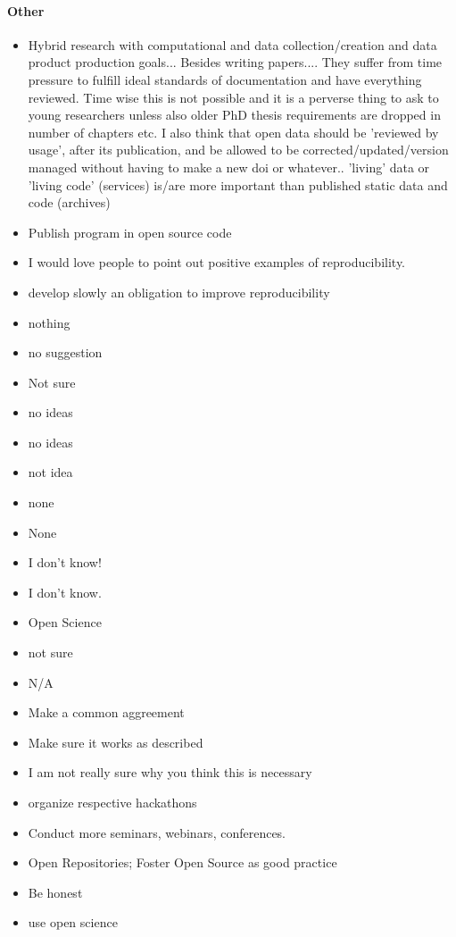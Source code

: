 \documentclass{article}
\begin{document}
\paragraph{Other}
\begin{itemize}
	\item Hybrid research with computational and data collection/creation and data product production goals... Besides writing papers.... They suffer from time pressure to fulfill ideal standards of documentation and have everything reviewed. Time wise this is not possible and it is a perverse thing to ask to young researchers unless also older PhD thesis requirements are dropped in number of chapters etc. I also think that open data should be 'reviewed by usage', after its publication, and be allowed to be corrected/updated/version managed without having to make a new doi or whatever.. 'living' data or 'living code' (services) is/are more important than published static data and code (archives)
	\item Publish program in open source code 
	\item I would love people to point out positive examples of reproducibility. 
	\item develop slowly an obligation to improve reproducibility
	\item nothing
	\item no suggestion
	\item Not sure
	\item no ideas
	\item no ideas
	\item not idea
	\item none
	\item None
	\item I don't know!
	\item I don't know.
	\item Open Science 
	\item not sure
	\item N/A 
	\item Make a common aggreement
	\item Make sure it works as described
	\item I am not really sure why you think this is necessary
	\item organize respective hackathons
	\item Conduct more seminars, webinars, conferences.
	\item Open Repositories; Foster Open Source as good practice
	\item Be honest
	\item use open science

\end{itemize}
\end{document}
